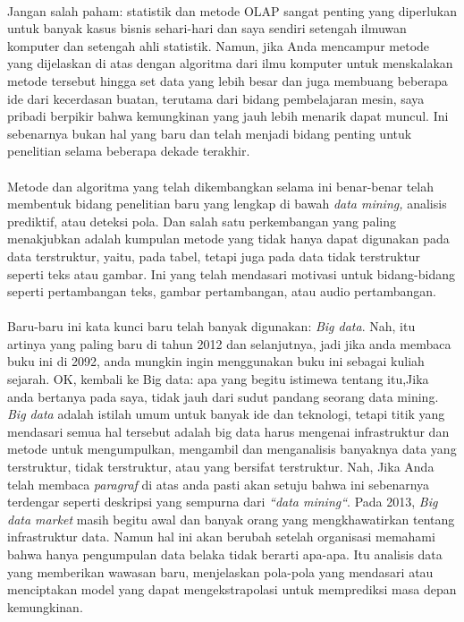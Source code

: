    \paragraph{}       Jangan salah paham: statistik dan metode OLAP sangat penting yang diperlukan untuk banyak kasus bisnis sehari-hari dan saya sendiri setengah ilmuwan komputer dan setengah ahli statistik. Namun, jika Anda mencampur metode yang dijelaskan di atas dengan algoritma dari ilmu komputer untuk menskalakan metode tersebut hingga set data yang lebih besar dan juga membuang beberapa ide dari kecerdasan buatan, terutama dari bidang pembelajaran mesin, saya pribadi berpikir bahwa kemungkinan yang jauh lebih menarik dapat muncul. Ini sebenarnya bukan hal yang baru dan telah menjadi bidang penting untuk penelitian selama beberapa dekade terakhir.
   
   \paragraph{}  Metode dan algoritma yang telah dikembangkan selama ini benar-benar telah membentuk bidang penelitian baru yang lengkap di bawah \textit{data mining,} analisis prediktif, atau deteksi pola. Dan salah satu perkembangan yang paling menakjubkan adalah kumpulan metode yang tidak hanya dapat digunakan pada data terstruktur, yaitu, pada tabel, tetapi juga pada data tidak terstruktur seperti teks atau gambar. Ini yang telah mendasari motivasi untuk bidang-bidang seperti pertambangan teks, gambar pertambangan, atau audio pertambangan. 
   
   \paragraph{} Baru-baru ini kata kunci baru telah banyak digunakan: \textit{Big data}. Nah, itu artinya yang paling baru di tahun 2012 dan selanjutnya, jadi jika anda membaca buku ini di 2092, anda mungkin ingin menggunakan buku ini sebagai kuliah sejarah. OK, kembali ke Big data: apa yang begitu istimewa tentang itu,Jika anda bertanya pada saya, tidak jauh dari sudut pandang seorang data mining. \textit{Big data} adalah istilah umum untuk banyak ide dan teknologi, tetapi titik yang mendasari semua hal tersebut adalah big data harus mengenai infrastruktur dan metode untuk mengumpulkan, mengambil dan menganalisis banyaknya data yang terstruktur, tidak terstruktur, atau yang bersifat terstruktur. Nah, Jika Anda telah membaca \textit{paragraf }di atas anda pasti akan setuju bahwa ini sebenarnya terdengar seperti deskripsi yang sempurna dari \textit{“data mining“}. Pada 2013, \textit{Big data market }masih begitu awal dan banyak orang yang mengkhawatirkan tentang infrastruktur data. Namun hal ini akan berubah setelah organisasi memahami bahwa hanya pengumpulan data belaka tidak berarti apa-apa. Itu analisis data yang memberikan wawasan baru, menjelaskan pola-pola yang mendasari atau menciptakan model yang dapat mengekstrapolasi untuk memprediksi masa depan kemungkinan.
   
